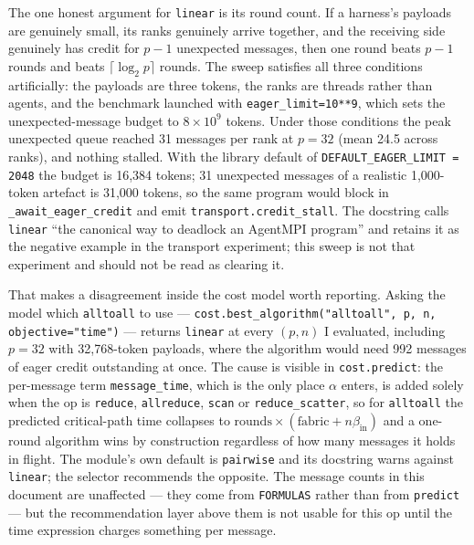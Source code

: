 \documentclass[11pt]{article}
\begin{document}
The one honest argument for \texttt{linear} is its round count. If a harness's payloads are
genuinely small, its ranks genuinely arrive together, and the receiving side genuinely has
credit for $p-1$ unexpected messages, then one round beats $p-1$ rounds and beats
$\lceil\log_2 p\rceil$ rounds. The sweep satisfies all three conditions artificially: the
payloads are three tokens, the ranks are threads rather than agents, and the benchmark
launched with \texttt{eager\_limit=10**9}, which sets the unexpected-message budget to
$8\times10^9$ tokens. Under those conditions the peak unexpected queue reached 31 messages
per rank at $p=32$ (mean 24.5 across ranks), and nothing stalled. With the library default of
\texttt{DEFAULT\_EAGER\_LIMIT = 2048} the budget is 16,384 tokens; 31 unexpected messages of a
realistic 1,000-token artefact is 31,000 tokens, so the same program would block in
\texttt{\_await\_eager\_credit} and emit \texttt{transport.credit\_stall}. The docstring calls
\texttt{linear} ``the canonical way to deadlock an AgentMPI program'' and retains it as the
negative example in the transport experiment; this sweep is not that experiment and should not
be read as clearing it.

That makes a disagreement inside the cost model worth reporting. Asking the model which
\texttt{alltoall} to use --- \texttt{cost.best\_algorithm("alltoall", p, n,
objective="time")} --- returns \texttt{linear} at every $(p, n)$ I evaluated, including $p=32$
with 32,768-token payloads, where the algorithm would need 992 messages of eager credit
outstanding at once. The cause is visible in \texttt{cost.predict}: the per-message term
\texttt{message\_time}, which is the only place $\alpha$ enters, is added solely when the op is
\texttt{reduce}, \texttt{allreduce}, \texttt{scan} or \texttt{reduce\_scatter}, so for
\texttt{alltoall} the predicted critical-path time collapses to
$\text{rounds} \times (\text{fabric} + n\beta_\text{in})$ and a one-round algorithm wins by
construction regardless of how many messages it holds in flight. The module's own default is
\texttt{pairwise} and its docstring warns against \texttt{linear}; the selector recommends the
opposite. The message counts in this document are unaffected --- they come from
\texttt{FORMULAS} rather than from \texttt{predict} --- but the recommendation layer above them
is not usable for this op until the time expression charges something per message.
\end{document}
